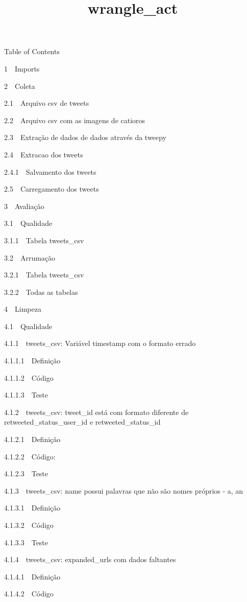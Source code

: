 \documentclass[11pt]{article}
\title{wrangle\_act}
\begin{document}
    
    
    \maketitle
    
    

    
    Table of Contents{}

{{1~~}Imports}

{{2~~}Coleta}

{{2.1~~}Arquivo csv de tweets}

{{2.2~~}Arquivo csv com as imagens de catioros}

{{2.3~~}Extração de dados de dados através da tweepy}

{{2.4~~}Extracao dos tweets}

{{2.4.1~~}Salvamento dos tweets}

{{2.5~~}Carregamento dos tweets}

{{3~~}Avaliação}

{{3.1~~}Qualidade}

{{3.1.1~~}Tabela tweets\_csv}

{{3.2~~}Arrumação}

{{3.2.1~~}Tabela tweets\_csv}

{{3.2.2~~}Todas as tabelas}

{{4~~}Limpeza}

{{4.1~~}Qualidade}

{{4.1.1~~}tweets\_csv: Variável timestamp com o formato errado}

{{4.1.1.1~~}Definição}

{{4.1.1.2~~}Código}

{{4.1.1.3~~}Teste}

{{4.1.2~~}tweets\_csv: tweet\_id está com formato diferente de
retweeted\_status\_user\_id e retweeted\_status\_id}

{{4.1.2.1~~}Definição}

{{4.1.2.2~~}Código:}

{{4.1.2.3~~}Teste}

{{4.1.3~~}tweets\_csv: name possui palavras que não são nomes próprios -
a, an}

{{4.1.3.1~~}Definição}

{{4.1.3.2~~}Código}

{{4.1.3.3~~}Teste}

{{4.1.4~~}tweets\_csv: expanded\_urls com dados faltantes}

{{4.1.4.1~~}Definição}

{{4.1.4.2~~}Código}
\end{document}
